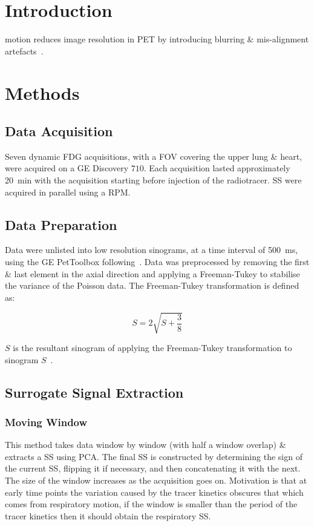 \section{Introduction} \label{sec:introduction}
     motion reduces image resolution in \gls{PET} by introducing blurring \& mis-alignment artefacts~\cite{Nehmeh2008a}. 

\section{Methods} \label{sec:methods}
\subsection{Data Acquisition} \label{sec:data_acquisition}
        Seven dynamic \gls{FDG} acquisitions, with a \gls{FOV} covering the upper lung \& heart, were acquired on a \gls{GE} Discovery $710$. Each acquisition lasted approximately \SI{20}{\minute} with the acquisition starting before injection of the radiotracer. \gls{SS} were acquired in parallel using a \gls{RPM}.
        
    \subsection{Data Preparation} \label{sec:data_preparation}
        Data were unlisted into low resolution sinograms, at a time interval of \SI{500}{\milli\second}, using the \gls{GE} PetToolbox following~\cite{Bertolli2018Data-DrivenTomography}. Data was preprocessed by removing the first \& last element in the axial direction and applying a Freeman-Tukey to stabilise the variance of the Poisson data. The Freeman-Tukey transformation is defined as:
        
        \begin{equation}
            S = 2 \sqrt{S + \frac{3}{8}}
        \end{equation}
        
        \noindent $S$ is the resultant sinogram of applying the Freeman-Tukey transformation to sinogram $S$~\cite{Freeman1950TransformationsRoot}.
    
    \subsection{Surrogate Signal Extraction} \label{sec:surrogate_signal_extraction}
        \subsubsection{Moving Window} \label{sec:moving_window}
            This method takes data window by window (with half a window overlap) \& extracts a \gls{SS} using \gls{PCA}. The final \gls{SS} is constructed by determining the sign of the current \gls{SS}, flipping it if necessary, and then concatenating it with the next. The size of the window increases as the acquisition goes on. Motivation is that at early time points the variation caused by the tracer kinetics obscures that which comes from respiratory motion, if the window is smaller than the period of the tracer kinetics then it should obtain the respiratory \gls{SS}.
        
